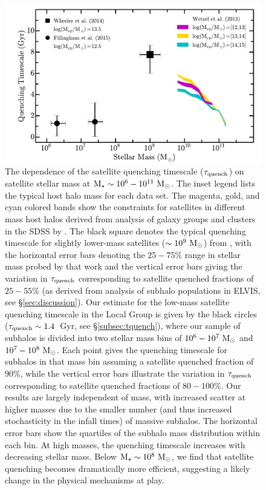 \documentclass[usenatbib]{mn2e}
\newcommand{\mstar}{{\rm M}_{\star}}
\newcommand{\msun}{{\rm M}_{\odot}}
\begin{document}
\begin{figure}
\centering
\hspace*{-0.15in}
\includegraphics[width=5.0in]{f5.pdf}
\caption{The dependence of the satellite quenching timescale
  ($\tau_{\rm quench}$) on satellite stellar mass at $\mstar \sim
  10^{6}-10^{11}~\msun$. The inset legend lists the typical host halo
  mass for each data set. The magenta, gold, and cyan colored bands
  show the constraints for satellites in different mass host halos
  derived from analysis of galaxy groups and clusters in the SDSS by
  \citet{wetzel13}. The black square denotes the typical quenching
  timescale for slightly lower-mass satellites ($\sim10^{9}~\msun$)
  from \citet{wheeler14}, with the horizontal error bars denoting the
  $25-75\%$ range in stellar mass probed by that work and the vertical
  error bars giving the variation in $\tau_{\rm quench}$ corresponding
  to satellite quenched fractions of $25-55\%$ (as derived from
  analysis of subhalo populations in ELVIS, see
  \S\ref{sec:discussion}). Our estimate for the low-mass satellite
  quenching timescale in the Local Group is given by the black circles
  ($\tau_{\rm quench} \sim 1.4$~Gyr, see \S\ref{subsec:tquench}),
  where our sample of subhalos is divided into two stellar mass bins
  of $10^{6}-10^{7}~\msun$ and $10^{7}-10^{8}~\msun$. Each point gives
  the quenching timescale for subhalos in that mass bin assuming a
  satellite quenched fraction of $90\%$, while the vertical error bars
  illustrate the variation in $\tau_{\rm quench}$ corresponding to
  satellite quenched fractions of $80-100\%$. Our results are largely
  independent of mass, with increased scatter at higher masses due to
  the smaller number (and thus increased stochasticity in the infall
  times) of massive subhalos. The horizontal error bars show the
  quartiles of the subhalo mass distribution within each bin. At high
  masses, the quenching timescale increases with decreasing stellar
  mass. Below ${\rm M}_{\star}\sim10^{8}~\msun$, we find that
  satellite quenching becomes dramatically more efficient, suggesting
  a likely change in the physical mechanisms at play.}
\label{fig:tquench}
\end{figure}
\end{document}
